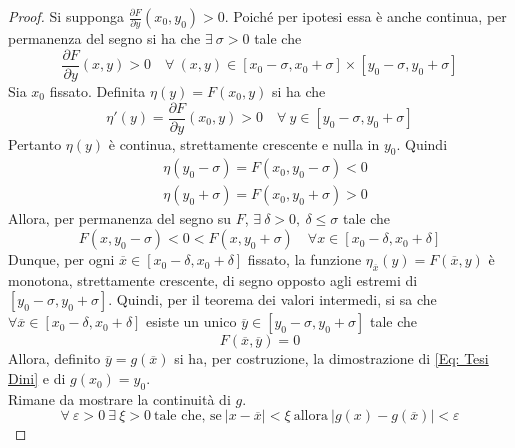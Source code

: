 \begin{proof}
        Si supponga $\frac{\partial{F}}{\partial{y}}(x_0,y_0) > 0$. Poiché per ipotesi essa è anche continua, per permanenza del segno si ha che $\exists\ \sigma > 0$ tale che
        \begin{equation}
            \frac{\partial{F}}{\partial{y}}(x,y) > 0 \quad \forall\ (x,y) \in [x_0-\sigma, x_0+\sigma]\times [y_0 - \sigma, y_0+\sigma]
        \end{equation}
       Sia $x_0$ fissato. Definita $\eta(y)=F(x_0, y)$ si ha che
       \begin{equation}
           \eta'(y)=\frac{\partial{F}}{\partial{y}}(x_0, y) >0 \quad \forall\ y \in [y_0 - \sigma, y_0+\sigma]
       \end{equation}
       Pertanto $\eta(y)$ è continua, strettamente crescente e nulla in $y_0$. Quindi
       \begin{equation}
       \begin{aligned}
           &\eta(y_0-\sigma)=F(x_0, y_0-\sigma)<0\\
           &\eta(y_0+\sigma)=F(x_0, y_0+\sigma)>0
       \end{aligned}
       \end{equation}
       Allora, per permanenza del segno su $F$, $\exists\ \delta>0,\ \delta \leq \sigma$ tale che 
       \begin{equation}
           F(x, y_0-\sigma) < 0 < F(x, y_0+\sigma) \quad \forall x \in [x_0-\delta, x_0+\delta]
       \end{equation}
       Dunque, per ogni $\overline{x} \in [x_0-\delta, x_0+\delta]$ fissato, la funzione $\eta_{\overline{x}}(y)=F(\overline{x}, y)$ è monotona, strettamente crescente, di segno opposto agli estremi di $[y_0 - \sigma, y_0+\sigma]$. Quindi, per il teorema dei valori intermedi, si sa che $\forall \overline{x} \in [x_0-\delta, x_0+\delta]$ esiste un unico $\overline{y} \in [y_0-\sigma, y_0+\sigma]$ tale che 
       \begin{equation}
           F(\overline{x}, \overline{y})=0
       \end{equation}
       Allora, definito $\overline{y}=g(\overline{x})$ si ha, per costruzione, la dimostrazione di \eqref{Eq: Tesi Dini} e di $g(x_0)=y_0$.\\
       Rimane da mostrare la continuità di $g$.
       \begin{equation}
           \forall\ \varepsilon > 0\ \exists\ \xi > 0\ \text{tale che, se}\ |x-\overline{x}|< \xi\ \text{allora}\ |g(x)-g(\overline{x})| < \varepsilon

\end{equation}
\end{proof}
